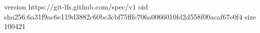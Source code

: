 version https://git-lfs.github.com/spec/v1
oid sha256:6a31f9ac6e119d3882c60bc3cbf75fffc706a0066010fd2d558f00acaf67e0f4
size 100421
